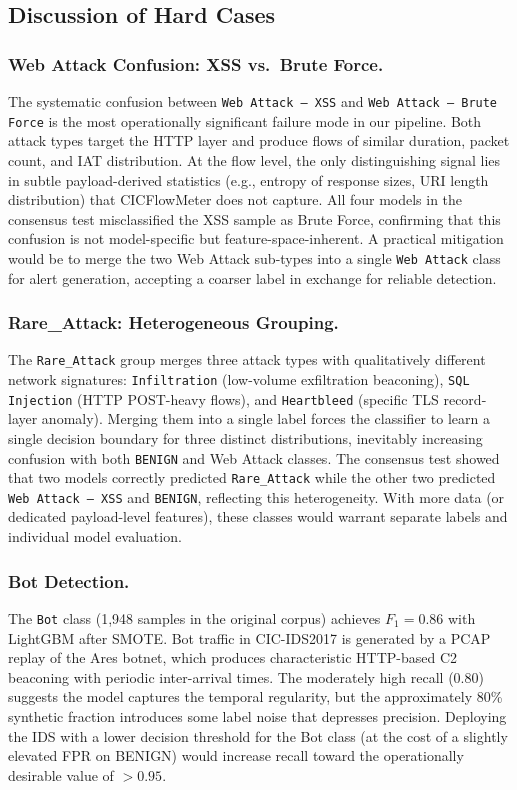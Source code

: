\subsection{Discussion of Hard Cases}
\label{sec:exp-scenarios}

\subsubsection*{Web Attack Confusion: XSS vs.\ Brute Force.}
The systematic confusion between \texttt{Web Attack -- XSS} and \texttt{Web Attack -- Brute Force} is the most operationally significant failure mode in our pipeline. Both attack types target the HTTP layer and produce flows of similar duration, packet count, and IAT distribution. At the flow level, the only distinguishing signal lies in subtle payload-derived statistics (e.g., entropy of response sizes, URI length distribution) that CICFlowMeter does not capture. All four models in the consensus test misclassified the XSS sample as Brute Force, confirming that this confusion is not model-specific but feature-space-inherent. A practical mitigation would be to merge the two Web Attack sub-types into a single \texttt{Web Attack} class for alert generation, accepting a coarser label in exchange for reliable detection.

\subsubsection*{Rare\_Attack: Heterogeneous Grouping.}
The \texttt{Rare\_Attack} group merges three attack types with qualitatively different network signatures: \texttt{Infiltration} (low-volume exfiltration beaconing), \texttt{SQL Injection} (HTTP POST-heavy flows), and \texttt{Heartbleed} (specific TLS record-layer anomaly). Merging them into a single label forces the classifier to learn a single decision boundary for three distinct distributions, inevitably increasing confusion with both \texttt{BENIGN} and Web Attack classes. The consensus test showed that two models correctly predicted \texttt{Rare\_Attack} while the other two predicted \texttt{Web Attack -- XSS} and \texttt{BENIGN}, reflecting this heterogeneity. With more data (or dedicated payload-level features), these classes would warrant separate labels and individual model evaluation.

\subsubsection*{Bot Detection.}
The \texttt{Bot} class (1,948 samples in the original corpus) achieves $F_1 = 0.86$ with LightGBM after SMOTE. Bot traffic in CIC-IDS2017 is generated by a PCAP replay of the Ares botnet, which produces characteristic HTTP-based C2 beaconing with periodic inter-arrival times. The moderately high recall (0.80) suggests the model captures the temporal regularity, but the approximately 80\% synthetic fraction introduces some label noise that depresses precision. Deploying the IDS with a lower decision threshold for the Bot class (at the cost of a slightly elevated FPR on BENIGN) would increase recall toward the operationally desirable value of $> 0.95$.
